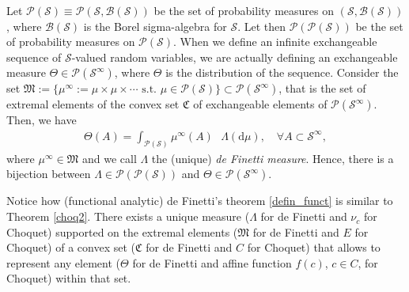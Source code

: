 \documentclass[12pt, reqno]{amsart}
\theoremstyle{definition}
\begin{document}
Let $\mathscr{P}(\mathcal{S})\equiv \mathscr{P}(\mathcal{S},\mathcal{B}(\mathcal{S}))$ be the set of probability measures on $(\mathcal{S},\mathcal{B}(\mathcal{S}))$, where $\mathcal{B}(\mathcal{S})$ is the Borel sigma-algebra for $\mathcal{S}$. Let then $\mathscr{P}( \mathscr{P}(\mathcal{S}) )$ be the set of probability measures on $\mathscr{P}(\mathcal{S})$. When we define an infinite exchangeable sequence of $\mathcal{S}$-valued random variables, we are actually defining an exchangeable measure $\Theta\in\mathscr{P}(\mathcal{S}^\infty)$, where $\Theta$ is the distribution of the sequence. Consider the set $\mathfrak{M}:=\{ \mu^\infty:=\mu \times \mu \times \cdots \text{ s.t. } \mu \in \mathscr{P}(\mathcal{S}) \} \subset \mathscr{P}(\mathcal{S}^\infty)$, that is the set of extremal elements of the convex set $\mathfrak{C}$ of exchangeable elements of $\mathscr{P}(\mathcal{S}^\infty)$. Then, we have
\begin{align}\label{defin_funct}
\Theta(A)=\int_{\mathscr{P}(\mathcal{S})} \mu^\infty(A) \text{ } \Lambda(\text{d}\mu), \quad \forall A \subset \mathcal{S}^\infty,
\end{align}
where $\mu^\infty \in \mathfrak{M}$ and we call $\Lambda$ the (unique) \textit{de Finetti measure}. Hence, there is a bijection between $\Lambda \in \mathscr{P} ( \mathscr{P}(\mathcal{S}) )$ and $\Theta \in \mathscr{P}(\mathcal{S}^\infty)$. 

Notice how (functional analytic) de Finetti's theorem \eqref{defin_funct} is similar to Theorem \ref{choq2}. There exists a unique measure ($\Lambda$ for de Finetti and $\nu_c$ for Choquet) supported on the extremal elements ($\mathfrak{M}$ for de Finetti and $E$ for Choquet) of a convex set ($\mathfrak{C}$ for de Finetti and $C$ for Choquet) that allows to represent any element ($\Theta$ for de Finetti and affine function $f(c)$, $c\in C$, for Choquet) within that set.







\end{document}
